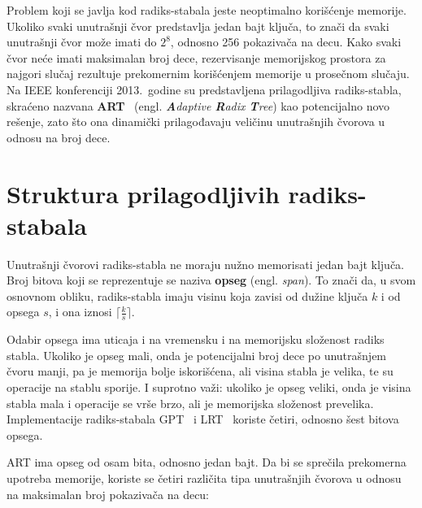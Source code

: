 \documentclass[12pt,oneside]{memoir}
\begin{document}
Problem koji se javlja kod radiks-stabala jeste neoptimalno korišćenje memorije.
Ukoliko svaki unutrašnji čvor predstavlja jedan bajt ključa, to znači da
svaki unutrašnji čvor može imati do $ 2^{8} $, odnosno 256 pokazivača na decu.
Kako svaki čvor neće imati maksimalan broj dece, rezervisanje memorijskog prostora
za najgori slučaj rezultuje prekomernim korišćenjem memorije u prosečnom slučaju.
Na IEEE konferenciji 2013.\ godine su predstavljena prilagodljiva radiks-stabla,
skraćeno nazvana \textbf{ART}~\cite{artful}
(engl. \emph{\textbf{A}daptive \textbf{R}adix \textbf{T}ree})
kao potencijalno novo rešenje, zato što ona dinamički
prilagođavaju veličinu unutrašnjih čvorova u odnosu na broj dece.

\section{Struktura prilagodljivih radiks-stabala}

Unutrašnji čvorovi radiks-stabla ne moraju nužno memorisati jedan bajt ključa.
Broj bitova koji se reprezentuje se naziva \textbf{opseg} (engl. \emph{span}).
To znači da, u svom osnovnom obliku, radiks-stabla imaju visinu koja zavisi od
dužine ključa $k$ i od opsega $s$, i ona iznosi $ \lceil \frac{k}{s} \rceil $.

Odabir opsega ima uticaja i na vremensku i na memorijsku složenost radiks
stabla. Ukoliko je opseg mali, onda je potencijalni broj dece po unutrašnjem
čvoru manji, pa je memorija bolje iskorišćena, ali visina stabla je velika,
te su operacije na stablu sporije. I suprotno važi: ukoliko je opseg veliki,
onda je visina stabla mala i operacije se vrše brzo, ali je memorijska složenost
prevelika. Implementacije radiks-stabala GPT~\cite{gpt} i LRT~\cite{lrt}
koriste četiri, odnosno šest bitova opsega.

ART ima opseg od osam bita, odnosno jedan bajt. Da bi se sprečila prekomerna
upotreba memorije, koriste se četiri različita tipa unutrašnjih čvorova u odnosu
na maksimalan broj pokazivača na decu:
\end{document}
